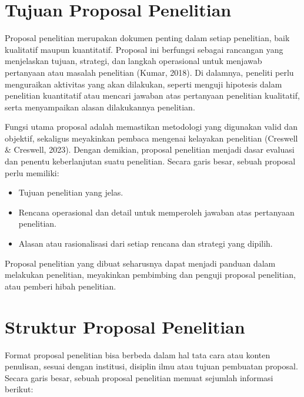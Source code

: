 \documentclass[
  indonesian,
  letterpaper,
  DIV=11,
  numbers=noendperiod]{scrreprt}
\providecommand{\tightlist}{%
  \setlength{\itemsep}{0pt}\setlength{\parskip}{0pt}}
\begin{document}
\section{Tujuan Proposal Penelitian}\label{tujuan-proposal-penelitian}

Proposal penelitian merupakan dokumen penting dalam setiap penelitian,
baik kualitatif maupun kuantitatif. Proposal ini berfungsi sebagai
rancangan yang menjelaskan tujuan, strategi, dan langkah operasional
untuk menjawab pertanyaan atau masalah penelitian (Kumar, 2018). Di
dalamnya, peneliti perlu menguraikan aktivitas yang akan dilakukan,
seperti menguji hipotesis dalam penelitian kuantitatif atau mencari
jawaban atas pertanyaan penelitian kualitatif, serta menyampaikan alasan
dilakukannya penelitian.

Fungsi utama proposal adalah memastikan metodologi yang digunakan valid
dan objektif, sekaligus meyakinkan pembaca mengenai kelayakan penelitian
(Creswell \& Creswell, 2023). Dengan demikian, proposal penelitian
menjadi dasar evaluasi dan penentu keberlanjutan suatu penelitian.
Secara garis besar, sebuah proposal perlu memiliki:

\begin{itemize}
\tightlist
\item
  Tujuan penelitian yang jelas.
\item
  Rencana operasional dan detail untuk memperoleh jawaban atas
  pertanyaan penelitian.
\item
  Alasan atau rasionalisasi dari setiap rencana dan strategi yang
  dipilih.
\end{itemize}

Proposal penelitian yang dibuat seharusnya dapat menjadi panduan dalam
melakukan penelitian, meyakinkan pembimbing dan penguji proposal
penelitian, atau pemberi hibah penelitian.

\section{Struktur Proposal
Penelitian}\label{struktur-proposal-penelitian}

Format proposal penelitian bisa berbeda dalam hal tata cara atau konten
penulisan, sesuai dengan institusi, disiplin ilmu atau tujuan pembuatan
proposal. Secara garis besar, sebuah proposal penelitian memuat sejumlah
informasi berikut:
\end{document}
